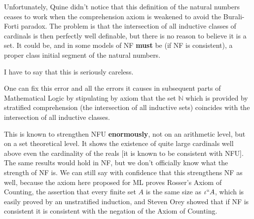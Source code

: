 \documentclass[12pt]{slides}
\begin{document}
\begin{slide}

Unfortunately, Quine didn't notice that this definition of the natural numbers ceases to work when the comprehension axiom is weakened to avoid the Burali-Forti paradox.  The problem is that the intersection of all inductive classes of cardinals is then perfectly well definable, but there is no reason to believe it is a set. It could be, and in some models of NF {\bf must} be (if NF is consistent), a proper class initial segment of the natural numbers.

I have to say that this is seriously careless.

\end{slide}

\begin{slide}

One can fix this error and all the errors it causes in subsequent parts of Mathematical Logic by stipulating by axiom that the set $\mathbb N$  which is provided by stratified comprehension (the intersection of all inductive sets) coincides with the intersection of all inductive classes.

This is known to strengthen NFU {\bf enormously}, not on an arithmetic level, but on a set theoretical level.  It shows the existence of quite large cardinals well above even the cardinality of the reals [it is known to be consistent with NFU].  The same results would hold in NF, but we don't officially know what the strength of NF is.  We can still say with confidence that this strengthens NF as well, because the axiom here proposed for ML proves Rosser's Axiom of Counting, the assertion that
every finite set $A$ is the same size as $\iota``A$, which is easily proved by an unstratified induction, and Steven Orey showed that if NF is consistent it is consistent with the negation of the Axiom of Counting.




\end{slide}
\end{document}
